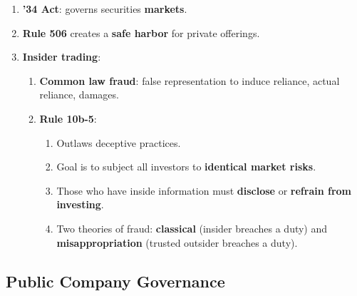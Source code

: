 \begin{enumerate}
\begin{enumerate}
\begin{enumerate}
        \end{enumerate}
    \end{enumerate}
    \item \textbf{'34 Act}: governs securities \textbf{markets}.
    \item \textbf{Rule 506} creates a \textbf{safe harbor} for private 
    offerings.
    \item \textbf{Insider trading}:
    \begin{enumerate}
        \item \textbf{Common law fraud}: false representation to induce 
        reliance, actual reliance, damages.
        \item \textbf{Rule 10b-5}:
        \begin{enumerate}
            \item Outlaws deceptive practices.
            \item Goal is to subject all investors to \textbf{identical market 
            risks}.
            \item Those who have inside information must \textbf{disclose} or 
            \textbf{refrain from investing}.
            \item Two theories of fraud: \textbf{classical} (insider breaches 
            a duty) and \textbf{misappropriation} (trusted outsider breaches a 
            duty).
        \end{enumerate} 
    \end{enumerate}
\end{enumerate}

\newpage

\subsection{Public Company Governance}

